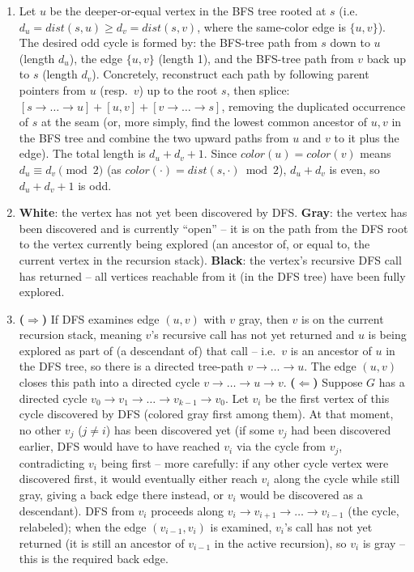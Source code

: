 \documentclass[11pt]{article}
\begin{document}
\begin{enumerate}[label=\textbf{A\arabic*.}, leftmargin=2.2em]
\item Let $u$ be the deeper-or-equal vertex in the BFS tree rooted at $s$ (i.e.\
$d_u = dist(s,u) \ge d_v = dist(s,v)$, where the same-color edge is $\{u,v\}$). The
desired odd cycle is formed by: the BFS-tree path from $s$ down to $u$ (length $d_u$), the
edge $\{u,v\}$ (length 1), and the BFS-tree path from $v$ back up to $s$ (length $d_v$).
Concretely, reconstruct each path by following parent pointers from $u$ (resp.\ $v$) up to
the root $s$, then splice: $[s \to \dots \to u] + [u,v] + [v \to \dots \to s]$, removing
the duplicated occurrence of $s$ at the seam (or, more simply, find the lowest common
ancestor of $u,v$ in the BFS tree and combine the two upward paths from $u$ and $v$ to it
plus the edge). The total length is $d_u + d_v + 1$. Since $color(u)=color(v)$ means
$d_u \equiv d_v \pmod 2$ (as $color(\cdot) = dist(s,\cdot) \bmod 2$), $d_u + d_v$ is even,
so $d_u + d_v + 1$ is odd.

\item \textbf{White}: the vertex has not yet been discovered by DFS. \textbf{Gray}: the
vertex has been discovered and is currently ``open'' -- it is on the path from the DFS
root to the vertex currently being explored (an ancestor of, or equal to, the current
vertex in the recursion stack). \textbf{Black}: the vertex's recursive DFS call has
returned -- all vertices reachable from it (in the DFS tree) have been fully explored.

\item \textbf{($\Rightarrow$)} If DFS examines edge $(u,v)$ with $v$ gray, then $v$ is on
the current recursion stack, meaning $v$'s recursive call has not yet returned and $u$ is
being explored as part of (a descendant of) that call -- i.e.\ $v$ is an ancestor of $u$
in the DFS tree, so there is a directed tree-path $v \to \dots \to u$. The edge $(u,v)$
closes this path into a directed cycle $v \to \dots \to u \to v$. \textbf{($\Leftarrow$)}
Suppose $G$ has a directed cycle $v_0 \to v_1 \to \dots \to v_{k-1} \to v_0$. Let $v_i$ be
the first vertex of this cycle discovered by DFS (colored gray first among them). At that
moment, no other $v_j$ ($j \ne i$) has been discovered yet (if some $v_j$ had been
discovered earlier, DFS would have to have reached $v_i$ via the cycle from $v_j$,
contradicting $v_i$ being first -- more carefully: if any other cycle vertex were
discovered first, it would eventually either reach $v_i$ along the cycle while still gray,
giving a back edge there instead, or $v_i$ would be discovered as a descendant). DFS from
$v_i$ proceeds along $v_i \to v_{i+1} \to \dots \to v_{i-1}$ (the cycle, relabeled); when
the edge $(v_{i-1}, v_i)$ is examined, $v_i$'s call has not yet returned (it is still an
ancestor of $v_{i-1}$ in the active recursion), so $v_i$ is gray -- this is the required
back edge.


\end{enumerate}
\end{document}
